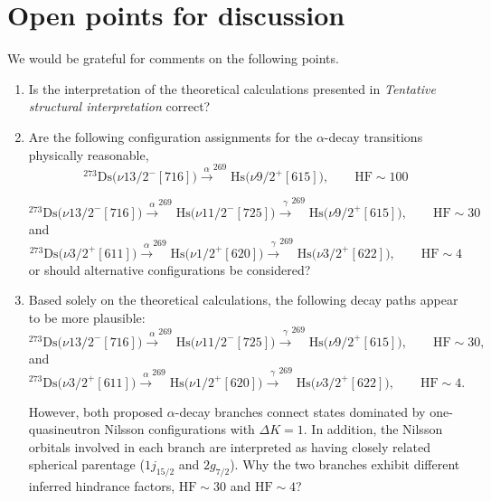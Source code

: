 \documentclass[11pt]{article}
\begin{document}
\section*{Open points for discussion}

We would be grateful for comments on the following points.

\begin{enumerate}
\item Is the interpretation of the theoretical calculations presented in \textit{Tentative structural interpretation} correct?

\item Are the following configuration assignments for the $\alpha$-decay transitions physically reasonable,
\[
^{273}\mathrm{Ds}\bigl(\nu 13/2^{-}[716]\bigr)
\xrightarrow{\alpha}
^{269}\mathrm{Hs}\bigl(\nu 9/2^{+}[615]\bigr),\qquad \mathrm{HF}\sim 100
\]

\[
^{273}\mathrm{Ds}\bigl(\nu 13/2^{-}[716]\bigr)
\xrightarrow{\alpha}
^{269}\mathrm{Hs}\bigl(\nu 11/2^{-}[725]\bigr)
\xrightarrow{\gamma}
^{269}\mathrm{Hs}\bigl(\nu 9/2^{+}[615]\bigr),
\qquad \mathrm{HF}\sim 30
\]
and
$$
^{273}\mathrm{Ds}\bigl(\nu 3/2^{+}[611]\bigr)
\xrightarrow{\alpha}
^{269}\mathrm{Hs}\bigl(\nu 1/2^{+}[620]\bigr)
\xrightarrow{\gamma}
^{269}\mathrm{Hs}\bigl(\nu 3/2^{+}[622]\bigr),
\qquad \mathrm{HF}\sim 4
$$
or should alternative configurations be considered?

\item Based solely on the theoretical calculations, the following decay paths appear to be more plausible:
\[
^{273}\mathrm{Ds}\bigl(\nu 13/2^{-}[716]\bigr)
\xrightarrow{\alpha}
^{269}\mathrm{Hs}\bigl(\nu 11/2^{-}[725]\bigr)
\xrightarrow{\gamma}
^{269}\mathrm{Hs}\bigl(\nu 9/2^{+}[615]\bigr),
\qquad \mathrm{HF}\sim 30,
\]
and
\[
^{273}\mathrm{Ds}\bigl(\nu 3/2^{+}[611]\bigr)
\xrightarrow{\alpha}
^{269}\mathrm{Hs}\bigl(\nu 1/2^{+}[620]\bigr)
\xrightarrow{\gamma}
^{269}\mathrm{Hs}\bigl(\nu 3/2^{+}[622]\bigr),
\qquad \mathrm{HF}\sim 4.
\]

However, both proposed $\alpha$-decay branches connect states dominated by one-quasineutron Nilsson configurations with $\Delta K=1$. In addition, the Nilsson orbitals involved in each branch are interpreted as having closely related spherical parentage ($1j_{15/2}$ and $2g_{7/2}$). Why the two branches exhibit different inferred hindrance factors, $\mathrm{HF}\sim30$ and $\mathrm{HF}\sim4$?
\end{enumerate}



\end{document}
